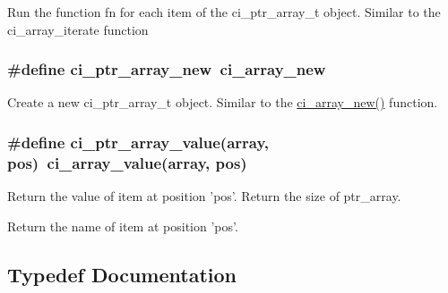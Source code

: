 Run the function fn for each item of the ci\_\-ptr\_\-array\_\-t object. Similar to the ci\_\-array\_\-iterate function \hypertarget{group__PTR__ARRAYS_gaa8d81dcc1ca7ab9beeb79ff5cb17b9b4}{
\subsubsection[{ci\_\-ptr\_\-array\_\-new}]{\setlength{\rightskip}{0pt plus 5cm}\#define ci\_\-ptr\_\-array\_\-new~ci\_\-array\_\-new}}
\label{group__PTR__ARRAYS_gaa8d81dcc1ca7ab9beeb79ff5cb17b9b4}


Create a new ci\_\-ptr\_\-array\_\-t object. Similar to the \hyperlink{group__SIMPLE__ARRAYS_ga2ea1f00c1df7ca10c9a612891d085bef}{ci\_\-array\_\-new()} function. \hypertarget{group__PTR__ARRAYS_ga7c8945c7c3dbdddd2d2df99186bcf1f1}{
\subsubsection[{ci\_\-ptr\_\-array\_\-value}]{\setlength{\rightskip}{0pt plus 5cm}\#define ci\_\-ptr\_\-array\_\-value(array, \/  pos)~ci\_\-array\_\-value(array, pos)}}
\label{group__PTR__ARRAYS_ga7c8945c7c3dbdddd2d2df99186bcf1f1}


Return the value of item at position 'pos'. Return the size of ptr\_\-array.

Return the name of item at position 'pos'. 

\subsection{Typedef Documentation}
\hypertarget{group__PTR__ARRAYS_gacc2dabd40cf8cfb19cbcd73156a4cf3c}{
\subsubsection[{ci\_\-ptr\_\-array\_\-t}]{}}
\label{group__PTR__ARRAYS_gacc2dabd40cf8cfb19cbcd73156a4cf3c}


